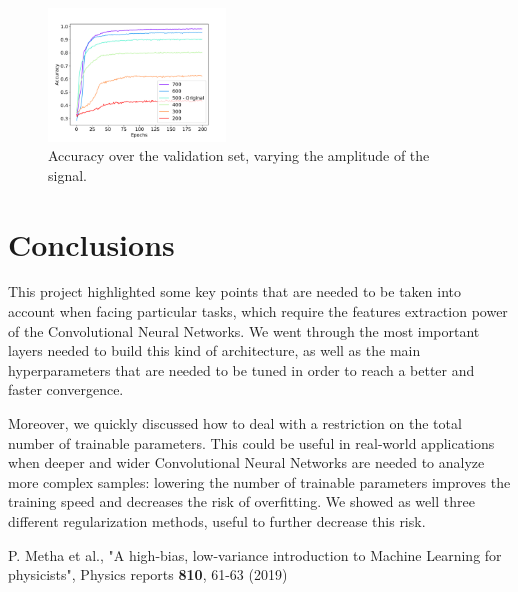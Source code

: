 \documentclass[prl, twocolumn]{revtex4-1}
\begin{document}
\begin{figure}[h]
    \centering
    \includegraphics[width=0.42\textwidth]{pics/sig_noise.pdf}
    \caption{Accuracy over the validation set, varying the amplitude of the signal.}
    \label{fig:point4_acc}
\end{figure}


\section{Conclusions}

This project highlighted some key points that are needed to be taken into account when facing particular tasks, which require the features extraction power of the Convolutional Neural Networks. We went through the most important layers needed to build this kind of architecture, as well as the main hyperparameters that are needed to be tuned in order to reach a better and faster convergence.

Moreover, we quickly discussed how to deal with a restriction on the total number of trainable parameters. This could be useful in real-world applications when deeper and wider Convolutional Neural Networks are needed to analyze more complex samples: lowering the number of trainable parameters improves the training speed and decreases the risk of overfitting. We showed as well three different regularization methods, useful to further decrease this risk.


\begin{thebibliography}{99}

  P. Metha et al.,
  "A high-bias, low-variance introduction to Machine Learning for physicists", Physics reports
  {\bf 810}, 61-63 (2019)
  
\end{thebibliography}
\end{document}

